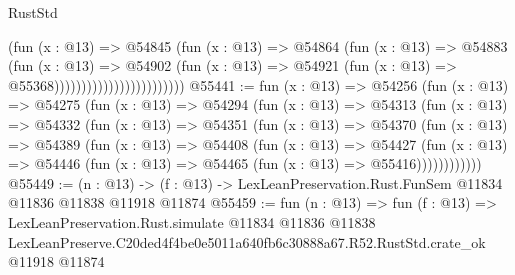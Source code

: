 \begin{lexlean}{RustStd}
\begin{coremodule}
                                        (fun (x : @13) =>
                                        @54845
                                          (fun (x : @13) =>
                                          @54864
                                            (fun (x : @13) =>
                                            @54883
                                              (fun (x : @13) =>
                                              @54902
                                                (fun (x : @13) =>
                                                @54921
                                                  (fun (x : @13) => @55368))))))))))))))))))))))))
@55441 := fun (x : @13) =>
  @54256
    (fun (x : @13) =>
    @54275
      (fun (x : @13) =>
      @54294
        (fun (x : @13) =>
        @54313
          (fun (x : @13) =>
          @54332
            (fun (x : @13) =>
            @54351
              (fun (x : @13) =>
              @54370
                (fun (x : @13) =>
                @54389
                  (fun (x : @13) =>
                  @54408
                    (fun (x : @13) =>
                    @54427
                      (fun (x : @13) =>
                      @54446 (fun (x : @13) => @54465 (fun (x : @13) => @55416))))))))))))
@55449 := (n : @13) ->
  (f : @13) -> LexLeanPreservation.Rust.FunSem @11834 @11836 @11838 @11918 @11874
@55459 := fun (n : @13) =>
  fun (f : @13) =>
  LexLeanPreservation.Rust.simulate
    @11834
    @11836
    @11838
    LexLeanPreserve.C20ded4f4be0e5011a640fb6c30888a67.R52.RustStd.crate_ok
    @11918
    @11874
\end{coremodule}
\end{lexlean}
